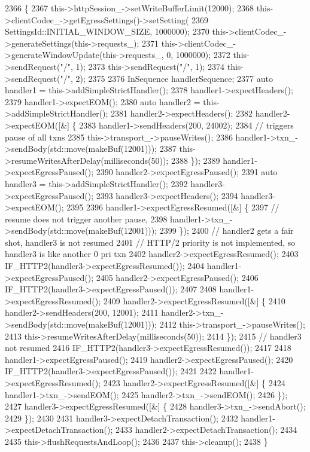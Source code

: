 \begin{DoxyCode}
2366                                                         \{
2367   this->httpSession\_->setWriteBufferLimit(12000);
2368   this->clientCodec\_->getEgressSettings()->setSetting(
2369     SettingsId::INITIAL\_WINDOW\_SIZE, 1000000);
2370   this->clientCodec\_->generateSettings(this->requests\_);
2371   this->clientCodec\_->generateWindowUpdate(this->requests\_, 0, 1000000);
2372   this->sendRequest(\textcolor{stringliteral}{"/"}, 1);
2373   this->sendRequest(\textcolor{stringliteral}{"/"}, 1);
2374   this->sendRequest(\textcolor{stringliteral}{"/"}, 2);
2375 
2376   InSequence handlerSequence;
2377   \textcolor{keyword}{auto} handler1 = this->addSimpleStrictHandler();
2378   handler1->expectHeaders();
2379   handler1->expectEOM();
2380   \textcolor{keyword}{auto} handler2 = this->addSimpleStrictHandler();
2381   handler2->expectHeaders();
2382   handler2->expectEOM([&] \{
2383       handler1->sendHeaders(200, 24002);
2384       \textcolor{comment}{// triggers pause of all txns}
2385       this->transport\_->pauseWrites();
2386       handler1->txn\_->sendBody(std::move(makeBuf(12001)));
2387       this->resumeWritesAfterDelay(milliseconds(50));
2388     \});
2389   handler1->expectEgressPaused();
2390   handler2->expectEgressPaused();
2391   \textcolor{keyword}{auto} handler3 = this->addSimpleStrictHandler();
2392   handler3->expectEgressPaused();
2393   handler3->expectHeaders();
2394   handler3->expectEOM();
2395 
2396   handler1->expectEgressResumed([&] \{
2397       \textcolor{comment}{// resume does not trigger another pause,}
2398       handler1->txn\_->sendBody(std::move(makeBuf(12001)));
2399     \});
2400   \textcolor{comment}{// handler2 gets a fair shot, handler3 is not resumed}
2401   \textcolor{comment}{// HTTP/2 priority is not implemented, so handler3 is like another 0 pri txn}
2402   handler2->expectEgressResumed();
2403   IF_HTTP2(handler3->expectEgressResumed());
2404   handler1->expectEgressPaused();
2405   handler2->expectEgressPaused();
2406   IF_HTTP2(handler3->expectEgressPaused());
2407 
2408   handler1->expectEgressResumed();
2409   handler2->expectEgressResumed([&] \{
2410       handler2->sendHeaders(200, 12001);
2411       handler2->txn\_->sendBody(std::move(makeBuf(12001)));
2412       this->transport\_->pauseWrites();
2413       this->resumeWritesAfterDelay(milliseconds(50));
2414     \});
2415   \textcolor{comment}{// handler3 not resumed}
2416   IF_HTTP2(handler3->expectEgressResumed());
2417 
2418   handler1->expectEgressPaused();
2419   handler2->expectEgressPaused();
2420   IF_HTTP2(handler3->expectEgressPaused());
2421 
2422   handler1->expectEgressResumed();
2423   handler2->expectEgressResumed([&] \{
2424       handler1->txn\_->sendEOM();
2425       handler2->txn\_->sendEOM();
2426     \});
2427   handler3->expectEgressResumed([&] \{
2428       handler3->txn\_->sendAbort();
2429     \});
2430 
2431   handler3->expectDetachTransaction();
2432   handler1->expectDetachTransaction();
2433   handler2->expectDetachTransaction();
2434 
2435   this->flushRequestsAndLoop();
2436 
2437   this->cleanup();
2438 \}
\end{DoxyCode}
